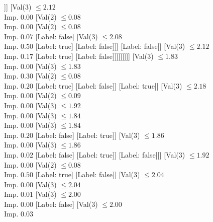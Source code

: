 \documentclass[margin=10pt]{standalone}
\begin{document}
\begin{forest}
												[Val($3$) $ \leq 2.05$ \\ Imp. $0.08$
													[Label: false]
													[Val($3$) $ \leq 2.06$ \\ Imp. $0.18$
														[Label: true]
														[Label: false]]]
												[Val($3$) $ \leq 2.12$ \\ Imp. $0.00$
													[Val($2$) $ \leq 0.08$ \\ Imp. $0.00$
														[Val($2$) $ \leq 0.08$ \\ Imp. $0.07$
															[Label: false]
															[Val($3$) $ \leq 2.08$ \\ Imp. $0.50$
																[Label: true]
																[Label: false]]]
														[Label: false]]
													[Val($3$) $ \leq 2.12$ \\ Imp. $0.17$
														[Label: true]
														[Label: false]]]]]]]]]
						[Val($3$) $ \leq 1.83$ \\ Imp. $0.00$
							[Val($3$) $ \leq 1.83$ \\ Imp. $0.30$
								[Val($2$) $ \leq 0.08$ \\ Imp. $0.20$
									[Label: true]
									[Label: false]]
								[Label: true]]
							[Val($3$) $ \leq 2.18$ \\ Imp. $0.00$
								[Val($2$) $ \leq 0.09$ \\ Imp. $0.00$
									[Val($3$) $ \leq 1.92$ \\ Imp. $0.00$
										[Val($3$) $ \leq 1.84$ \\ Imp. $0.00$
											[Val($3$) $ \leq 1.84$ \\ Imp. $0.20$
												[Label: false]
												[Label: true]]
											[Val($3$) $ \leq 1.86$ \\ Imp. $0.00$
												[Val($3$) $ \leq 1.86$ \\ Imp. $0.02$
													[Label: false]
													[Label: true]]
												[Label: false]]]
										[Val($3$) $ \leq 1.92$ \\ Imp. $0.00$
											[Val($2$) $ \leq 0.08$ \\ Imp. $0.50$
												[Label: true]
												[Label: false]]
											[Val($3$) $ \leq 2.04$ \\ Imp. $0.00$
												[Val($3$) $ \leq 2.04$ \\ Imp. $0.01$
													[Val($3$) $ \leq 2.00$ \\ Imp. $0.00$
														[Label: false]
														[Val($3$) $ \leq 2.00$ \\ Imp. $0.03$

\end{forest}
\end{document}
